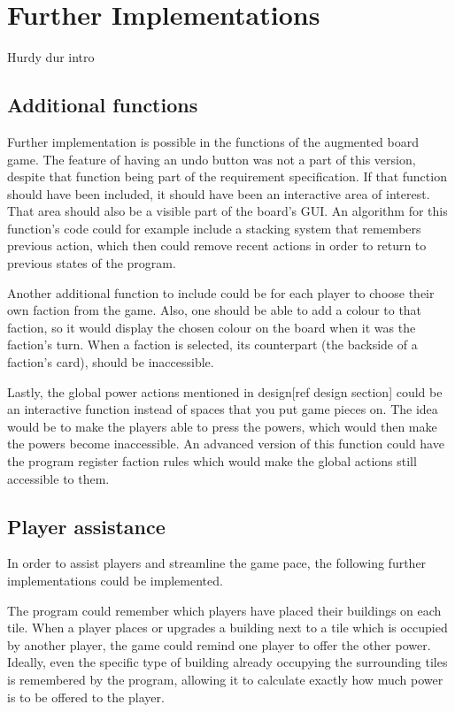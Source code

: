 \chapter{Further Implementations}\label{ch:furthimp}
Hurdy dur intro

\section{Additional functions}
Further implementation is possible in the functions of the augmented board game. The feature of having an undo button was not a part of this version, despite that function being part of the requirement specification. If that function should have been included, it should have been an interactive area of interest. That area should also be a visible part of the board’s GUI. An algorithm for this function’s code could for example include a stacking system that remembers previous action, which then could remove recent actions in order to return to previous states of the program.

Another additional function to include could be for each player to choose their own faction from the game. Also, one should be able to add a colour to that faction, so it would display the chosen colour on the board when it was the faction’s turn. When a faction is selected, its counterpart (the backside of a faction’s card), should be inaccessible.

Lastly, the global power actions mentioned in design[ref design section] could be an interactive function instead of spaces that you put game pieces on. The idea would be to make the players able to press the powers, which would then make the powers become inaccessible. An advanced version of this function could have the program register faction rules which would make the global actions still accessible to them. 

\section{Player assistance}
In order to assist players and streamline the game pace, the following further implementations could be implemented.

The program could remember which players have placed their buildings on each tile. When a player places or upgrades a building next to a tile which is occupied by another player, the game could remind one player to offer the other power. Ideally, even the specific type of building already occupying the surrounding tiles is remembered by the program, allowing it to calculate exactly how much power is to be offered to the player.

